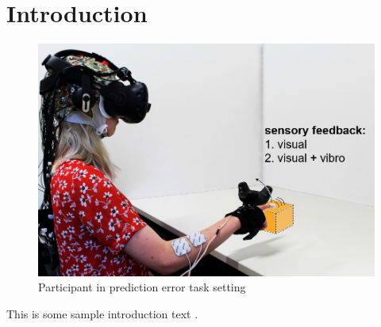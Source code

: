 \section{Introduction}

\begin{figure}[h!]
\centering
\includegraphics[scale=.3]{figures/Participant-Task-PE.png}
\caption{Participant in prediction error task setting}
\label{fig:task}
\end{figure}

This is some sample introduction text .